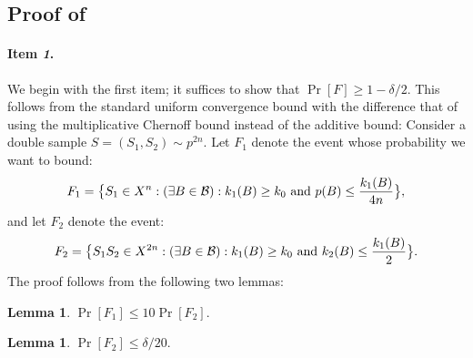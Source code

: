 \documentclass{article}
\newtheorem{lemma}[theorem]{Lemma}
\newcommand{\B}{{\cal B}}
\newcommand{\samp}{S}
\begin{document}
\subsection{Proof of }

\paragraph{Item {\it 1}.}
We begin with the first item;
it suffices to show that $\Pr[F]\geq 1-\delta/2$.
This follows from the standard uniform convergence bound with
the difference that of using the multiplicative Chernoff bound instead
of the additive bound:
Consider a double sample $S=(\samp_1,\samp_2)\sim p^{2n}$.
Let $F_1$ denote the event whose probability we want to bound:
\[
F_1 =\bigl\{ S_1\in X^n : (\exists {B\in\B}):
  k_{1}(B) \geq k_0 \mbox{ and } p(B) \leq \frac{k_{1}(B)}{4n}\bigr\}, 
\]
and let $F_2$ denote the event:
\[
F_2 = 
\bigl\{ S_1S_2\in X^{2n} : (\exists {B\in\B}):
  k_{1}(B) \geq k_0 \mbox{ and } k_{2}(B) \leq \frac{k_{1}(B)}{2}\bigr\}.
\]
The proof follows from the following two lemmas:
\begin{lemma}\label{lem:aux11}
$\Pr[F_1]\leq 10\Pr[F_2].$
\end{lemma}
\begin{lemma}\label{lem:aux12}
$\Pr[F_2]\leq \delta/20.$
\end{lemma}
\end{document}
